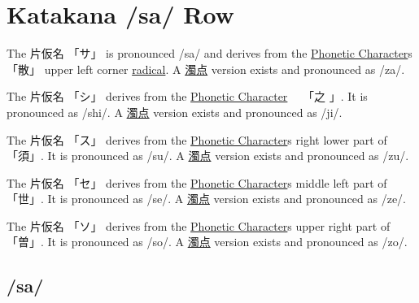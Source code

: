 \section{Katakana /sa/ Row}\label{sec:KatakanaSaRow}


\label{letter:sa} The  片仮名 {「サ」} is pronounced  /sa/ and
derives from the \hyperref[sec:PhoneticCharacter]{Phonetic Character}s {「散」}
upper left corner \hyperref[sec:Radical]{radical}.  A
\hyperref[sec:Dakuten]{濁点} version exists and pronounced as /za/.

\label{letter:shi} The 片仮名 {「シ」} derives from the
\hyperref[sec:PhoneticCharacter]{Phonetic Character}　 {「之 」}.  It is
pronounced as /shi/.  A \hyperref[sec:Dakuten]{濁点} version exists and
pronounced as /ji/.


\label{letter:su} The 片仮名 {「ス」} derives from the
\hyperref[sec:PhoneticCharacter]{Phonetic Character}s right lower part of
{「須」}.  It is pronounced as /su/.  A \hyperref[sec:Dakuten]{濁点} version
exists and pronounced as /zu/.

\label{letter:se} The 片仮名 {「セ」} derives from the
\hyperref[sec:PhoneticCharacter]{Phonetic Character}s middle left part of
{「世」}.  It is pronounced as /se/.  A \hyperref[sec:Dakuten]{濁点} version
exists and pronounced as /ze/.

\newpage

\label{letter:so} The 片仮名 {「ソ」} derives from the
\hyperref[sec:PhoneticCharacter]{Phonetic Character}s upper right part of
{「曽」}.  It is pronounced as /so/.  A \hyperref[sec:Dakuten]{濁点} version
exists and pronounced as /zo/.



\newpage
\subsection{/sa/}\label{sec:KatakanaSa}


